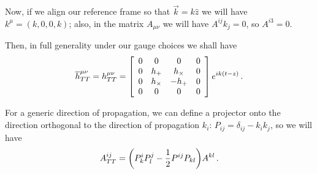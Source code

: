 \documentclass[main.tex]{subfiles}
\begin{document}
Now, if we align our reference frame so that \(\vec{k} = k \hat{z}\) we will have \(k^{\mu } = (k, 0, 0, k)\); also, in the matrix \(A_{\mu \nu }\) we will have \(A^{ij}k_{j} = 0\), so \(A^{i3}=0\). 

Then, in full generality under our gauge choices we shall have 
%
\begin{subequations}
\begin{align}
\overline{h}^{\mu \nu }_{TT} =
h^{\mu \nu }_{TT} = 
\left[\begin{array}{cccc}
0 & 0 & 0 & 0 \\ 
0 & h_{+} & h_{ \times } & 0 \\ 
0 & h_{ \times } & - h_{+} & 0 \\ 
0 & 0 & 0 & 0
\end{array}\right]
e^{i k \qty(t -z)}
\,.
\end{align}
\end{subequations}

For a generic direction of propagation, we can define a projector onto the direction orthogonal to the direction of propagation \(k_{i}\): \(P_{ij} = \delta_{ij} - k_i k_j\), so we will have 
%
\begin{align}
A^{ij}_{TT} = \qty(P^{i}_{k} P^{j}_{l} - \frac{1}{2} P^{ij} P_{kl})A^{kl}
\,.
\end{align}
\end{document}
